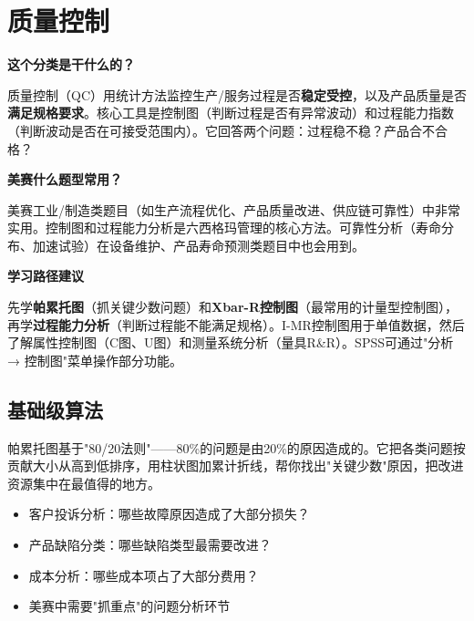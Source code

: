 \chapter{质量控制}

\begin{chapteroverview}
\textbf{这个分类是干什么的？}

质量控制（QC）用统计方法监控生产/服务过程是否\textbf{稳定受控}，以及产品质量是否\textbf{满足规格要求}。核心工具是控制图（判断过程是否有异常波动）和过程能力指数（判断波动是否在可接受范围内）。它回答两个问题：过程稳不稳？产品合不合格？

\textbf{美赛什么题型常用？}

美赛工业/制造类题目（如生产流程优化、产品质量改进、供应链可靠性）中非常实用。控制图和过程能力分析是六西格玛管理的核心方法。可靠性分析（寿命分布、加速试验）在设备维护、产品寿命预测类题目中也会用到。

\textbf{学习路径建议}

先学\textbf{帕累托图}（抓关键少数问题）和\textbf{Xbar-R控制图}（最常用的计量型控制图），再学\textbf{过程能力分析}（判断过程能不能满足规格）。I-MR控制图用于单值数据，然后了解属性控制图（C图、U图）和测量系统分析（量具R\&R）。SPSS可通过"分析 → 控制图"菜单操作部分功能。
\end{chapteroverview}

\section{基础级算法}


\begin{algointro}
帕累托图基于"80/20法则"——80\%的问题是由20\%的原因造成的。它把各类问题按贡献大小从高到低排序，用柱状图加累计折线，帮你找出"关键少数"原因，把改进资源集中在最值得的地方。
\end{algointro}

\begin{algoscene}
\begin{itemize}
    \item 客户投诉分析：哪些故障原因造成了大部分损失？
    \item 产品缺陷分类：哪些缺陷类型最需要改进？
    \item 成本分析：哪些成本项占了大部分费用？
    \item 美赛中需要"抓重点"的问题分析环节
\end{itemize}
\end{algoscene}

